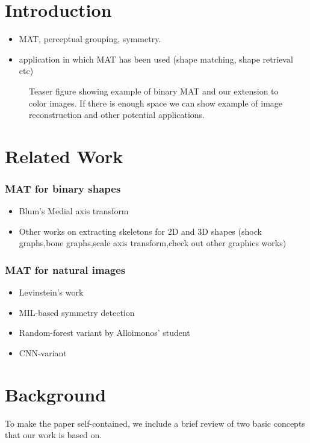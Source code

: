 \documentclass[10pt,twocolumn,letterpaper]{article}
\begin{document}
\section{Introduction}\label{sec:introduction}
\begin{itemize}
\item MAT, perceptual grouping, symmetry.
\item application in which MAT has been used (shape matching, shape retrieval etc)
\end{itemize}

\begin{figure}[!t]
\caption{Teaser figure showing example of binary MAT and our extension to color images.
If there is enough space we can show example of image reconstruction and other potential applications.}
\label{fig:teaser}
\end{figure}

\section{Related Work}\label{sec:related}
\subsubsection*{MAT for binary shapes}
\begin{itemize}
\item Blum's Medial axis transform
\item Other works on extracting skeletons for 2D and 3D shapes (shock graphs,bone graphs,scale axis transform,check out other graphics works)
\end{itemize}
\subsubsection*{MAT for natural images}
\begin{itemize}
\item Levinstein's work
\item MIL-based symmetry detection
\item Random-forest variant by Alloimonos' student
\item CNN-variant 
\end{itemize}

\section{Background}\label{sec:background}
To make the paper self-contained, we include a brief review of two basic concepts that our work is based on.
\end{document}
